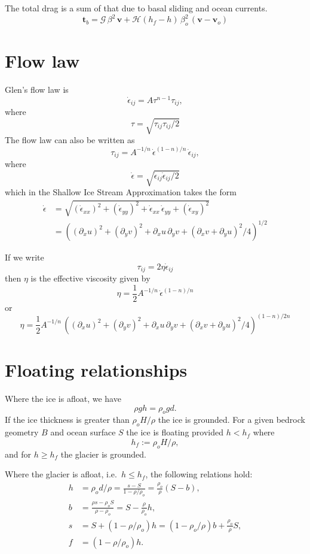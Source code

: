 \documentclass[10pt,a4paper]{book}
\newcommand{\He}{\mathcal{H}}
\newcommand{\G}{\mathcal{G}}
\newcommand{\p}{\partial}
\newcommand{\eps}{\dot{\epsilon}}
\newcommand{\eij}{\dot{\epsilon}_{ij}}
\newcommand{\exx}{\dot{\epsilon}_{xx}}
\newcommand{\eyy}{\dot{\epsilon}_{yy}}
\newcommand{\exy}{\dot{\epsilon}_{xy}}
\newcommand{\tij}{\tau_{ij}}
\begin{document}
The total drag is a sum of that due to basal sliding and ocean currents. 
\[
\bm{t}_b=\G \, \beta^2 \, \bm{v} + \He(h_f-h) \, \beta^2_o \, (\bm{v}-\bm{v}_o)
\] 

\section{Flow law}

Glen's flow law is 
\[
\eij=A \tau^{n-1} \tau_{ij},
\]
where  
\[
\tau=\sqrt{\tij \tij /2}
\]
The flow law can also be written as
\begin{equation}
\tau_{ij}=A^{-1/n} \,\dot{\epsilon}^{(1-n)/n}\, \dot{\epsilon}_{ij},
\label{eq:GlenTau}
\end{equation}
where
\[ 
\dot{\epsilon}=\sqrt{ \eij \eij /2}
\]                              %
which in the Shallow Ice Stream Approximation takes the form
\begin{align}
\eps& =\sqrt{ (\exx)^2 + (\eyy)^2 + \exx \,\eyy + (\exy)^2} \\
    & = ((\p_{x} u)^2 + (\p_{y} v)^2 + \p_{x} u \,\p_{y} v + (\p_{x} v + \p_{y} u)^2/4)^{1/2}
\end{align}


If we write
\[
\tau_{ij}= 2 \eta \eij
\]
then $\eta$ is the effective viscosity given by
\[
\eta=\frac{1}{2} A^{-1/n} \,\dot{\epsilon}^{(1-n)/n} 
\]
or
\[ 
\eta= \frac{1}{2} A^{-1/n} \, ((\p_{x} u)^2 + (\p_{y} v)^2 + \p_{x} u \,\p_{y} v + (\p_{x} v + \p_{y} u)^2/4)^{(1-n)/2n}
\]

\section{Floating relationships}
Where the ice is afloat, we have
\[  \rho g h = \rho_o g d .\]
If the ice thickness is greater than $\rho_o H/\rho$ the ice is grounded. For a given bedrock geometry $B$ and ocean
surface $S$ the ice is floating provided $h<h_f$ where
\begin{equation}
h_f := \rho_o H /\rho, 
\label{eq:float}
\end{equation}
and for $h \ge h_f$ the glacier is grounded.


Where the glacier is afloat, i.e.\ $h \le h_f$, the following relations hold:
\begin{align} 
h &= \rho_o d /\rho =\frac{s-S}{1-\rho/\rho_o} = \frac{\rho_o}{\rho} (S-b), \label{eq:hs1} \\
b &= \frac{\rho s - \rho_o S}{\rho-\rho_o}  = S-\frac{\rho}{\rho_o} h , \label{eq:bh1}\\
s &= S+(1-\rho/\rho_o) h = (1-\rho_o/\rho) b +\frac{\rho_o}{\rho} S, \label{eq:sb2}\\
f &= (1-\rho/\rho_o) h  . 
\end{align}
\end{document}
